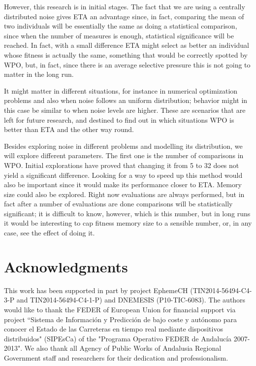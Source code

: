 \documentclass{llncs}
\begin{document}
However, this research is in initial stages. 
The fact that we are
using a centrally distributed noise gives ETA an advantage since, in
fact, comparing the mean of two individuals will be essentially the
same as doing a statistical comparison, since when the number of
measures is enough, statistical significance will be reached. In fact,
with a small difference ETA might select as better an individual whose
fitness is actually the same, something that would be correctly
spotted by WPO, but, in fact, since there is an average selective
pressure this is not going to matter in the long run. 

It might matter in different situations, for instance in numerical
optimization problems and also when noise follows an uniform
distribution; behavior might in this case be similar to when noise
levels are higher. These are scenarios that are left for future
research, and destined to find out in which situations WPO is better
than ETA and the other way round. 

Besides exploring noise in different problems and modelling its
distribution, we will explore different parameters. The first one is the number of comparisons in WPO. Initial
explorations have proved that changing it from 5 to 32 does not yield
a significant difference. Looking for a way to speed up this method
would also be important since it would make its performance closer to
ETA. Memory size could also be explored. Right now evaluations are
always performed, but in fact after a number of evaluations are done
comparisons will be statistically significant; it is difficult to
know, however, which is this number, but in long runs it would be
interesting to cap fitness memory size to a sensible number, or, in
any case, see the effect of doing it. 

\section*{Acknowledgments} %

This work has been supported in part by project EphemeCH
(TIN2014-56494-C4-3-P and TIN2014-56494-C4-1-P) and DNEMESIS (P10-TIC-6083).
The authors would like to thank the FEDER of European Union for
financial support via project ``Sistema de Informaci\'on y Predicci\'on de
bajo coste y aut\'onomo para conocer el Estado de las Carreteras en
tiempo real mediante dispositivos distribuidos" (SIPEsCa) of the
"Programa Operativo FEDER de Andaluc\'ia 2007-2013". We also thank all
Agency of Public Works of Andalusia Regional Government staff and
researchers for their dedication and professionalism.
\end{document}
